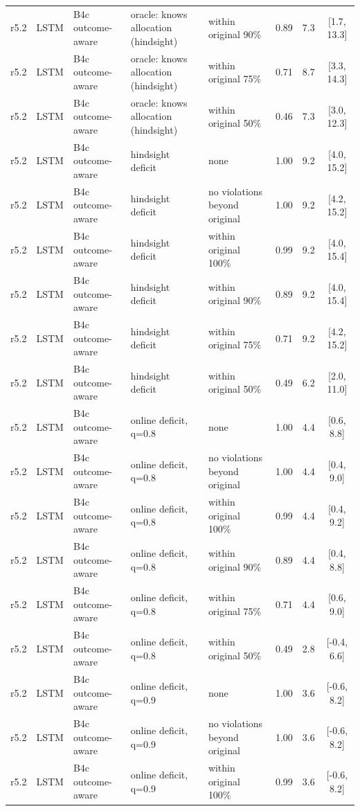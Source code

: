 \begin{longtable}{lllp{4.2cm}p{3.4cm}ccc}
r5.2 & LSTM & B4c outcome-aware & oracle: knows allocation (hindsight) & within original 90\% & 0.89 & 7.3 & [1.7, 13.3] \\
r5.2 & LSTM & B4c outcome-aware & oracle: knows allocation (hindsight) & within original 75\% & 0.71 & 8.7 & [3.3, 14.3] \\
r5.2 & LSTM & B4c outcome-aware & oracle: knows allocation (hindsight) & within original 50\% & 0.46 & 7.3 & [3.0, 12.3] \\
r5.2 & LSTM & B4c outcome-aware & hindsight deficit & none & 1.00 & 9.2 & [4.0, 15.2] \\
r5.2 & LSTM & B4c outcome-aware & hindsight deficit & no violations beyond original & 1.00 & 9.2 & [4.2, 15.2] \\
r5.2 & LSTM & B4c outcome-aware & hindsight deficit & within original 100\% & 0.99 & 9.2 & [4.0, 15.4] \\
r5.2 & LSTM & B4c outcome-aware & hindsight deficit & within original 90\% & 0.89 & 9.2 & [4.0, 15.4] \\
r5.2 & LSTM & B4c outcome-aware & hindsight deficit & within original 75\% & 0.71 & 9.2 & [4.2, 15.2] \\
r5.2 & LSTM & B4c outcome-aware & hindsight deficit & within original 50\% & 0.49 & 6.2 & [2.0, 11.0] \\
r5.2 & LSTM & B4c outcome-aware & online deficit, q=0.8 & none & 1.00 & 4.4 & [0.6, 8.8] \\
r5.2 & LSTM & B4c outcome-aware & online deficit, q=0.8 & no violations beyond original & 1.00 & 4.4 & [0.4, 9.0] \\
r5.2 & LSTM & B4c outcome-aware & online deficit, q=0.8 & within original 100\% & 0.99 & 4.4 & [0.4, 9.2] \\
r5.2 & LSTM & B4c outcome-aware & online deficit, q=0.8 & within original 90\% & 0.89 & 4.4 & [0.4, 8.8] \\
r5.2 & LSTM & B4c outcome-aware & online deficit, q=0.8 & within original 75\% & 0.71 & 4.4 & [0.6, 9.0] \\
r5.2 & LSTM & B4c outcome-aware & online deficit, q=0.8 & within original 50\% & 0.49 & 2.8 & [-0.4, 6.6] \\
r5.2 & LSTM & B4c outcome-aware & online deficit, q=0.9 & none & 1.00 & 3.6 & [-0.6, 8.2] \\
r5.2 & LSTM & B4c outcome-aware & online deficit, q=0.9 & no violations beyond original & 1.00 & 3.6 & [-0.6, 8.2] \\
r5.2 & LSTM & B4c outcome-aware & online deficit, q=0.9 & within original 100\% & 0.99 & 3.6 & [-0.6, 8.2] \\

\end{longtable}

